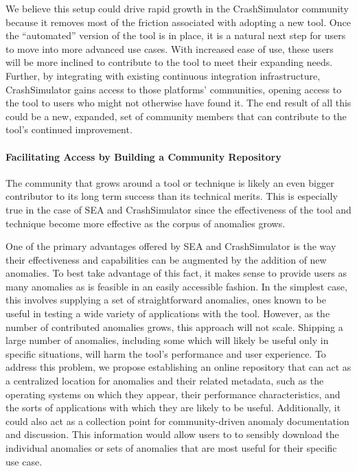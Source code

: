 We believe this setup could drive rapid growth in the CrashSimulator
community because it removes most of the friction associated with adopting
a new tool.  Once the ``automated'' version of the tool is in place, it is a
natural next step for users to move into more advanced use cases.
With increased ease of use, these users will be more inclined
to contribute to the tool to meet their expanding needs.
Further, by
integrating with existing continuous integration infrastructure,
CrashSimulator gains access to those platforms' communities,
opening access to the tool to users who might not otherwise have found it.
The end result of all this could be a new, expanded, set of community
members that can contribute to the tool's continued improvement.

\paragraph{Facilitating Access by Building a Community Repository}

The community that grows around a tool or
technique is likely an even bigger contributor to its long term success
than its technical merits.  This is especially true in the case of SEA and
CrashSimulator since the effectiveness of the tool and technique
become more effective
as the corpus of anomalies grows.

One of the primary advantages offered by SEA and CrashSimulator is the way
their effectiveness and capabilities can be augmented by the addition of
new anomalies.  To best take advantage of this fact, it makes sense to
provide users as many anomalies as is feasible in an easily accessible
fashion.  In the simplest case, this involves supplying a set of
straightforward anomalies, ones known to be useful in testing a wide
variety of applications with the tool.
However, as the number of contributed anomalies grows, this approach
will not scale.  Shipping a large number of anomalies, including some
which will likely be useful only in specific situations, will harm the
tool's performance and user experience.  To address this problem, we
propose establishing an online repository
that can act as a centralized location for anomalies
and their related metadata,
such as the operating systems on which they appear,
their performance characteristics, and the sorts of applications
with which they are likely to be useful.  Additionally, it could also
act as a collection point for community-driven anomaly documentation
and discussion.  This information would allow users to
to sensibly download the individual anomalies or sets of anomalies that are most
useful for their specific use case.


